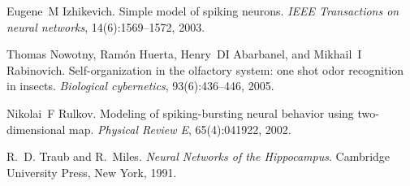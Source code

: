 
\begin{DoxyDescription}
\item[\label{_CITEREF_izhikevich2003simple}%
\mbox{[}1\mbox{]}]Eugene~M Izhikevich. Simple model of spiking neurons. {\itshape I\+E\+E\+E Transactions on neural networks}, 14(6)\+:1569--1572, 2003.


\item[\label{_CITEREF_nowotny2005self}%
\mbox{[}2\mbox{]}]Thomas Nowotny, Ram\'{o}n Huerta, Henry~D\+I Abarbanel, and Mikhail~I Rabinovich. Self-\/organization in the olfactory system\+: one shot odor recognition in insects. {\itshape Biological cybernetics}, 93(6)\+:436--446, 2005. 


\item[\label{_CITEREF_Rulkov2002}%
\mbox{[}3\mbox{]}]Nikolai~F Rulkov. Modeling of spiking-\/bursting neural behavior using two-\/dimensional map. {\itshape Physical Review E}, 65(4)\+:041922, 2002.


\item[\label{_CITEREF_Traub1991}%
\mbox{[}4\mbox{]}]R.~D. Traub and R.~Miles. {\itshape Neural Networks of the Hippocampus}. Cambridge University Press, New York, 1991.


\end{DoxyDescription}